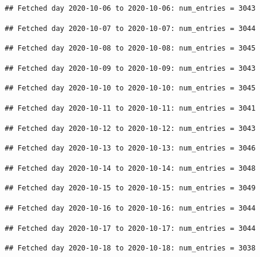 \documentclass[]{article}
\begin{document}
\begin{verbatim}
## Fetched day 2020-10-06 to 2020-10-06: num_entries = 3043
\end{verbatim}

\begin{verbatim}
## Fetched day 2020-10-07 to 2020-10-07: num_entries = 3044
\end{verbatim}

\begin{verbatim}
## Fetched day 2020-10-08 to 2020-10-08: num_entries = 3045
\end{verbatim}

\begin{verbatim}
## Fetched day 2020-10-09 to 2020-10-09: num_entries = 3043
\end{verbatim}

\begin{verbatim}
## Fetched day 2020-10-10 to 2020-10-10: num_entries = 3045
\end{verbatim}

\begin{verbatim}
## Fetched day 2020-10-11 to 2020-10-11: num_entries = 3041
\end{verbatim}

\begin{verbatim}
## Fetched day 2020-10-12 to 2020-10-12: num_entries = 3043
\end{verbatim}

\begin{verbatim}
## Fetched day 2020-10-13 to 2020-10-13: num_entries = 3046
\end{verbatim}

\begin{verbatim}
## Fetched day 2020-10-14 to 2020-10-14: num_entries = 3048
\end{verbatim}

\begin{verbatim}
## Fetched day 2020-10-15 to 2020-10-15: num_entries = 3049
\end{verbatim}

\begin{verbatim}
## Fetched day 2020-10-16 to 2020-10-16: num_entries = 3044
\end{verbatim}

\begin{verbatim}
## Fetched day 2020-10-17 to 2020-10-17: num_entries = 3044
\end{verbatim}

\begin{verbatim}
## Fetched day 2020-10-18 to 2020-10-18: num_entries = 3038
\end{verbatim}
\end{document}
